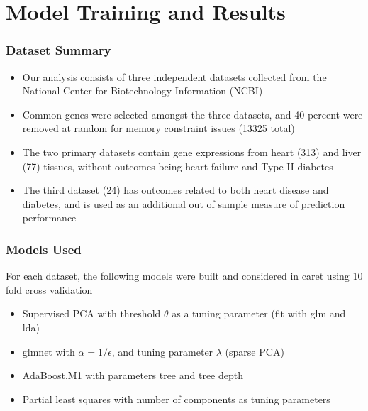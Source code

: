\documentclass[11pt]{beamer}
\begin{document}
\section{Model Training and Results}
\begin{frame}
\frametitle{Dataset Summary}
{\small
\begin{itemize}
\item Our analysis consists of three independent datasets collected from the National Center for Biotechnology Information (NCBI)
\item  Common genes were selected amongst the three datasets, and 40 percent were removed at random for memory constraint issues (13325 total)
\item The two primary datasets contain gene expressions from heart (313) and liver (77) tissues, without outcomes being heart failure and Type II diabetes
\item The third dataset (24)  has outcomes related to both heart disease and diabetes, and is used as an additional out of sample measure of prediction performance
\end{itemize}
}
\end{frame}

\begin{frame}
\frametitle{Models Used}
{
For each dataset, the following models were built and considered in caret using 10 fold cross validation
\begin{itemize}
\item Supervised PCA with threshold $\theta$ as a tuning parameter (fit with glm and lda)
\item glmnet with $\alpha = 1/\epsilon$, and tuning parameter $\lambda$ (sparse PCA)
\item AdaBoost.M1 with parameters tree and tree depth
\item Partial least squares with number of components as tuning parameters
\end{itemize}
}
\end{frame}
\end{document}

